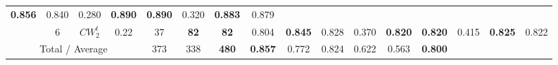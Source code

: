 \begin{table}[tph]
\begin{adjustbox}{angle=90}
{\begin{tabular}{c|c|cc|ccc|ccc|ccc|ccc}
                \textbf{0.856}
                                                                        & 0.840
                                                                        & 0.280                          &
                \textbf{0.890}
                                                                        &
                \textbf{0.890}
                                                                        & 0.320
                                                                        &
                \textbf{0.883}
                                                                        & 0.879
                \\
                                                                        & 6
                                                                        & $CW_{2}^{t}$                   & 0.22 & 37 &
                \textbf{82}
                                                                        &
                \textbf{82}
                                                                        & 0.804
                                                                        &
                \textbf{0.845}
                                                                        & 0.828
                                                                        & 0.370                          &
                \textbf{0.820}
                                                                        &
                \textbf{0.820}
                                                                        & 0.415
                                                                        &
                \textbf{0.825}
                                                                        & 0.822
                \\
                \hline
                \multicolumn{4}{c|}{Total / Average}                    & 373
                                                                        & 338                            &
                \textbf{480}
                                                                        &
                \textbf{0.857}
                                                                        & 0.772
                                                                        & 0.824
                                                                        & 0.622
                                                                        & 0.563
                                                                        &
                \textbf{0.800}

\end{tabular}}
\end{adjustbox}
\end{table}
